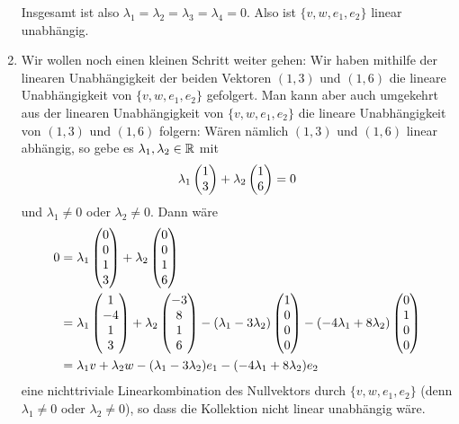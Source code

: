 \documentclass[a4paper,10pt]{article}
\begin{document}
\begin{bsp}
\begin{enumerate}[label=\alph*)]
   Insgesamt ist also $\lambda_1 = \lambda_2 = \lambda_3 = \lambda_4 = 0$. Also ist $\{v,w,e_1,e_2\}$ linear unabhängig.
   
  \item\label{enum: big to small}
   Wir wollen noch einen kleinen Schritt weiter gehen: Wir haben mithilfe der linearen Unabhängigkeit der beiden Vektoren $(1,3)$ und $(1,6)$ die lineare Unabhängigkeit von $\{v,w,e_1,e_2\}$ gefolgert. Man kann aber auch umgekehrt aus der linearen Unabhängigkeit von $\{v,w,e_1,e_2\}$ die lineare Unabhängigkeit von $(1,3)$ und $(1,6)$ folgern: Wären nämlich $(1,3)$ und $(1,6)$ linear abhängig, so gebe es $\lambda_1, \lambda_2 \in \mathbb{R}$ mit
   \begin{equation}\label{eqn: small linear dependence example}
    \lambda_1 \begin{pmatrix}1 \\ 3\end{pmatrix} + \lambda_2 \begin{pmatrix}1 \\ 6\end{pmatrix} = 0
   \end{equation}
   und $\lambda_1 \neq 0$ oder $\lambda_2 \neq 0$. Dann wäre
   \begin{equation}\label{eqn: big linear dependence example}
    \begin{aligned}
     0
     &= \lambda_1 \begin{pmatrix}0 \\ 0 \\ 1  \\ 3\end{pmatrix} + \lambda_2 \begin{pmatrix}0 \\ 0 \\ 1 \\ 6\end{pmatrix} \\
     &= \lambda_1 \begin{pmatrix}1 \\ -4 \\ 1 \\ 3\end{pmatrix} + \lambda_2 \begin{pmatrix}-3 \\ 8 \\ 1 \\ 6\end{pmatrix} - (\lambda_1 - 3 \lambda_2) \begin{pmatrix}1 \\ 0 \\ 0 \\ 0\end{pmatrix}
       - (-4 \lambda_1 + 8 \lambda_2) \begin{pmatrix}0 \\ 1 \\ 0 \\ 0\end{pmatrix} \\
     &= \lambda_1 v + \lambda_2 w - (\lambda_1 - 3 \lambda_2) e_1 - (-4 \lambda_1 + 8 \lambda_2) e_2
    \end{aligned}
   \end{equation}
   eine nichttriviale Linearkombination des Nullvektors durch $\{v,w,e_1,e_2\}$ (denn $\lambda_1 \neq 0$ oder $\lambda_2 \neq 0$), so dass die Kollektion nicht linear unabhängig wäre.
   

\end{enumerate}
\end{bsp}
\end{document}
